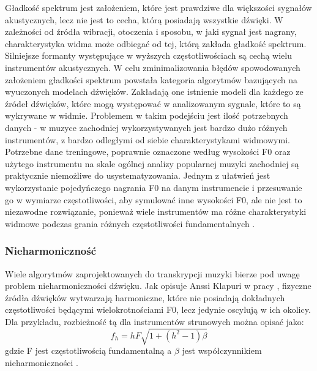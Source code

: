\documentclass[12pt,a4paper,twoside]{mwart}
\begin{document}
Gładkość spektrum jest założeniem, które jest prawdziwe dla większości sygnałów akustycznych, lecz nie jest to cecha, którą posiadają wszystkie dźwięki. W zależności od źródła wibracji, otoczenia i sposobu, w jaki sygnał jest nagrany, charakterystyka widma może odbiegać od tej, którą zakłada gładkość spektrum. Silniejsze formanty występujące w wyższych częstotliwościach są cechą wielu instrumentów akustycznych. W celu zminimalizowania błędów spowodowanych założeniem gładkości spektrum powstała kategoria algorytmów bazujących na wyuczonych modelach dźwięków. Zakładają one istnienie modeli dla każdego ze źródeł dźwięków, które mogą występować w analizowanym sygnale, które to są wykrywane w widmie. Problemem w takim podejściu jest ilość potrzebnych danych - w muzyce zachodniej wykorzystywanych jest bardzo dużo różnych instrumentów, z bardzo odległymi od siebie charakterystykami widmowymi. Potrzebne dane treningowe, poprawnie oznaczone według wysokości F0 oraz użytego instrumentu na skale ogólnej analizy popularnej muzyki zachodniej są praktycznie niemożliwe do usystematyzowania. Jednym z ułatwień jest wykorzystanie pojedyńczego nagrania F0 na danym instrumencie i przesuwanie go w wymiarze częstotliwości, aby symulować inne wysokości F0, ale nie jest to niezawodne rozwiązanie, ponieważ wiele instrumentów ma różne charakterystyki widmowe podczas grania różnych częstotliwości fundamentalnych 
\cite[55-68]{Transcription:Quenneville:Thesis}.

\subsubsection{Nieharmoniczność} \label{sec:multif0:inh:model}
Wiele algorytmów zaprojektowanych do transkrypcji muzyki bierze pod uwagę problem nieharmoniczności dźwięku. Jak opisuje Anssi Klapuri w pracy 
\cite[806-808]{Transcription:Klapuri:MultipleFundamentalFrequencyEstimation},
fizyczne źródła dźwięków wytwarzają harmoniczne, które nie posiadają dokładnych częstotliwości będącymi wielokrotnościami F0, lecz jedynie oscylują w ich okolicy. Dla przykładu, rozbieżność tą dla instrumentów strunowych można opisać jako:
\begin{equation}\label{eq:inharmonicity:strings}
  f_h = hF \sqrt{1 + (h^2 - 1) \beta}
\end{equation}
gdzie F jest częstotliwością fundamentalną a $\beta$ jest współczynnikiem nieharmoniczności 
\cite[807]{Transcription:Klapuri:MultipleFundamentalFrequencyEstimation}.
\end{document}
